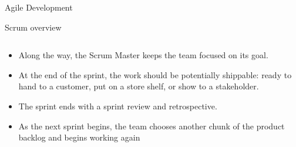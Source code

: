 \documentclass[final,hyperref={pdfpagelabels=false}]{beamer}
\begin{document}
\begin{frame}{Agile Development}
\begin{block}{Scrum overview}
\begin{columns}[t]
\begin{column}{.48\linewidth}
          \begin{itemize}
                \item Along the way, the Scrum Master keeps the team focused on its goal.
                \item At the end of the sprint, the work should be potentially shippable: ready to hand to a customer, put on a store shelf, or show to a stakeholder.
                \item The sprint ends with a sprint review and retrospective.
                \item As the next sprint begins, the team chooses another chunk of the product backlog and begins working again

          \end{itemize}
      
      \end{column}
    \end{columns}
      \end{block}
  \end{frame}
\end{document}
